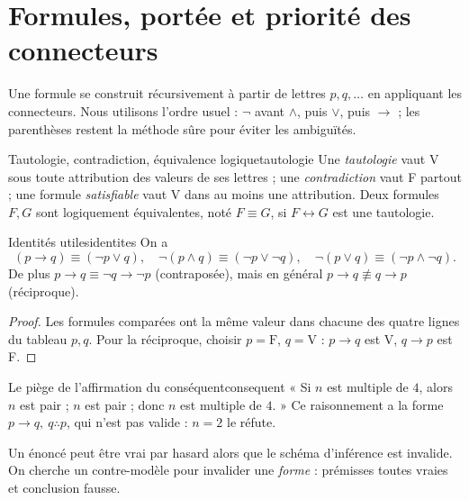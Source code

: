 \section{Formules, portée et priorité des connecteurs}
Une formule se construit récursivement à partir de lettres $p,q,\ldots$ en appliquant les connecteurs. Nous utilisons l'ordre usuel : $\neg$ avant $\wedge$, puis $\vee$, puis $\to$ ; les parenthèses restent la méthode sûre pour éviter les ambiguïtés.
\begin{definition}{Tautologie, contradiction, équivalence logique}{tautologie}
Une \emph{tautologie} vaut V sous toute attribution des valeurs de ses lettres ; une \emph{contradiction} vaut F partout ; une formule \emph{satisfiable} vaut V dans au moins une attribution. Deux formules $F,G$ sont logiquement équivalentes, noté $F\equiv G$, si $F\leftrightarrow G$ est une tautologie.
\end{definition}
\begin{proposition}{Identités utiles}{identites}
On a
\[
(p\to q)\equiv(\neg p\vee q),\quad
\neg(p\wedge q)\equiv(\neg p\vee\neg q),\quad
\neg(p\vee q)\equiv(\neg p\wedge\neg q).
\]
De plus $p\to q\equiv\neg q\to\neg p$ (contraposée), mais en général $p\to q\not\equiv q\to p$ (réciproque).
\end{proposition}
\begin{proof}
Les formules comparées ont la même valeur dans chacune des quatre lignes du tableau $p,q$. Pour la réciproque, choisir $p=\mathrm F$, $q=\mathrm V$ : $p\to q$ est V, $q\to p$ est F.
\end{proof}
\begin{exemple}{Le piège de l'affirmation du conséquent}{consequent}
« Si $n$ est multiple de $4$, alors $n$ est pair ; $n$ est pair ; donc $n$ est multiple de $4$. » Ce raisonnement a la forme $p\to q,\ q\therefore p$, qui n'est pas valide : $n=2$ le réfute.
\end{exemple}
\begin{attention}
Un énoncé peut être vrai par hasard alors que le schéma d'inférence est invalide. On cherche un contre-modèle pour invalider une \emph{forme} : prémisses toutes vraies et conclusion fausse.
\end{attention}

